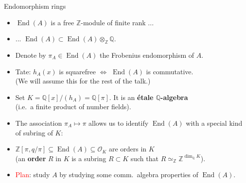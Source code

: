\documentclass[usenames,dvipsnames]{beamer}
\def\Q{\mathbb{Q}}
\def\Z{\mathbb{Z}}
\def\F{\mathbb{F}}
\DeclareMathOperator{\End}{End}
\DeclareMathOperator{\Jac}{Jac}
\newcommand{\cO}{{\mathcal O}}
\newcommand{\red}[1]{\textcolor{red}{#1}}
\begin{document}
\begin{frame}{ Endomorphism rings }
	\begin{itemize}
    \item $\End(A)$ is a free $\Z$-module of finite rank ... 
\pause 
    \item ... $\End(A) \subset \End(A)\otimes_\Z\Q$.
\pause 
    \item Denote by $\pi_A\in \End(A)$ the Frobenius endomorphism of $A$.
\pause 
    \item Tate: $h_A(x)$ is squarefree $\iff$ $\End(A)$ is commutative.\\
    (We will assume this for the rest of the talk.)
\pause 
    \item Set $K=\Q[x]/(h_A) = \Q[\pi]$. It is an {\bf \'etale $\Q$-algebra}\\
    (i.e.~a finite product of number fields).
\pause 
    \item The association $\pi_A \mapsto \pi$ allows us to identify $\End(A)$ with a special kind of subring of $K$:
\pause 
    \item $\Z[\pi,q/\pi] \subseteq \End(A) \subseteq \cO_K$ are orders in $K$\\
    (an {\bf order} $R$ in $K$ is a subring $R\subset K$ such that $R\simeq_\Z \Z^{\dim_\Q K}$).
\pause 
    \item 
    \red{Plan}: study $A$ by studying some comm.~algebra properties of $\End(A)$.
	\end{itemize}
\end{frame}

\end{document}
